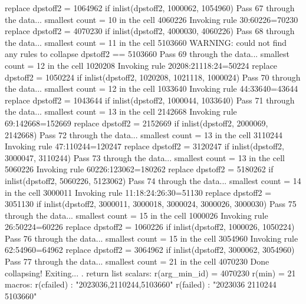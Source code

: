   replace dpstoff2 = 1064962 if inlist(dpstoff2, 1000062, 1054960)
Pass 67 through the data...
  smallest count = 10 in the cell      4060226
  Invoking rule 30:60226=70230
  replace dpstoff2 = 4070230 if inlist(dpstoff2, 4000030, 4060226)
Pass 68 through the data...
  smallest count = 11 in the cell      5103660
  WARNING: could not find any rules to collapse dpstoff2 == 5103660
Pass 69 through the data...
  smallest count = 12 in the cell      1020208
  Invoking rule 20208:21118:24=50224
  replace dpstoff2 = 1050224 if inlist(dpstoff2, 1020208, 1021118, 1000024)
Pass 70 through the data...
  smallest count = 12 in the cell      1033640
  Invoking rule 44:33640=43644
  replace dpstoff2 = 1043644 if inlist(dpstoff2, 1000044, 1033640)
Pass 71 through the data...
  smallest count = 13 in the cell      2142668
  Invoking rule 69:142668=152669
  replace dpstoff2 = 2152669 if inlist(dpstoff2, 2000069, 2142668)
Pass 72 through the data...
  smallest count = 13 in the cell      3110244
  Invoking rule 47:110244=120247
  replace dpstoff2 = 3120247 if inlist(dpstoff2, 3000047, 3110244)
Pass 73 through the data...
  smallest count = 13 in the cell      5060226
  Invoking rule 60226:123062=180262
  replace dpstoff2 = 5180262 if inlist(dpstoff2, 5060226, 5123062)
Pass 74 through the data...
  smallest count = 14 in the cell      3000011
  Invoking rule 11:18:24:26:30=51130
  replace dpstoff2 = 3051130 if inlist(dpstoff2, 3000011, 3000018, 3000024, 3000026, 3000030)
Pass 75 through the data...
  smallest count = 15 in the cell      1000026
  Invoking rule 26:50224=60226
  replace dpstoff2 = 1060226 if inlist(dpstoff2, 1000026, 1050224)
Pass 76 through the data...
  smallest count = 15 in the cell      3054960
  Invoking rule 62:54960=64962
  replace dpstoff2 = 3064962 if inlist(dpstoff2, 3000062, 3054960)
Pass 77 through the data...
  smallest count = 21 in the cell      4070230
  Done collapsing! Exiting...
{\smallskip}
. return list
{\smallskip}
scalars:
         r(arg_min_id) =  4070230
                r(min) =  21
{\smallskip}
macros:
            r(cfailed) : "2023036,2110244,5103660"
             r(failed) : "2023036 2110244 5103660"

